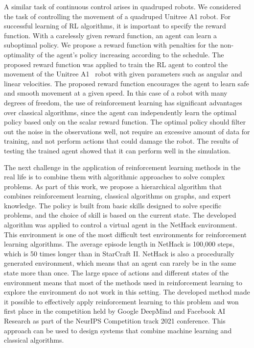 A similar task of continuous control arises in quadruped robots. We considered the task of controlling the movement of a quadruped Unitree A1 robot\cite{rl_unitree}. For successful learning of RL algorithms, it is important to specify the reward function. With a carelessly given reward function, an agent can learn a suboptimal policy. We propose a reward function with penalties for the non-optimality of the agent's policy increasing according to the schedule. The proposed reward function was applied to train the RL agent to control the movement of the Unitree A1~\cite{unitree} robot with given parameters such as angular and linear velocities. The proposed reward function encourages the agent to learn safe and smooth movement at a given speed. In this case of a robot with many degrees of freedom, the use of reinforcement learning has significant advantages over classical algorithms, since the agent can independently learn the optimal policy based only on the scalar reward function. The optimal policy should filter out the noise in the observations well, not require an excessive amount of data for training, and not perform actions that could damage the robot. The results of testing the trained agent showed that it can perform well in the simulation.

The next challenge in the application of reinforcement learning methods in the real life is to combine them with algorithmic approaches to solve complex problems. As part of this work, we propose a hierarchical algorithm that combines reinforcement learning, classical algorithms on graphs, and expert knowledge. The policy is built from basic skills designed to solve specific problems, and the choice of skill is based on the current state. The developed algorithm was applied to control a virtual agent in the NetHack \cite{nethack} environment. This environment is one of the most difficult test environments for reinforcement learning algorithms. The average episode length in NetHack is 100,000 steps, which is 50 times longer than in StarCraft II. NetHack is also a procedurally generated environment, which means that an agent can rarely be in the same state more than once. The large space of actions and different states of the environment means that most of the methods used in reinforcement learning to explore the environment do not work in this setting. The developed method made it possible to effectively apply reinforcement learning to this problem and won first place in the competition held by Google DeepMind and Facebook AI Research as part of the NeurIPS Competition track 2021 conference. This approach can be used to design systems that combine machine learning and classical algorithms.

